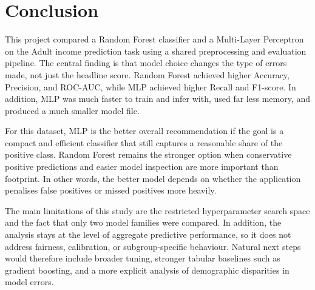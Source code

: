 \section{Conclusion}

This project compared a Random Forest classifier and a Multi-Layer Perceptron on the Adult income prediction task using a shared preprocessing and evaluation pipeline. The central finding is that model choice changes the type of errors made, not just the headline score. Random Forest achieved higher Accuracy, Precision, and ROC-AUC, while MLP achieved higher Recall and F1-score. In addition, MLP was much faster to train and infer with, used far less memory, and produced a much smaller model file.

For this dataset, MLP is the better overall recommendation if the goal is a compact and efficient classifier that still captures a reasonable share of the positive class. Random Forest remains the stronger option when conservative positive predictions and easier model inspection are more important than footprint. In other words, the better model depends on whether the application penalises false positives or missed positives more heavily.

The main limitations of this study are the restricted hyperparameter search space and the fact that only two model families were compared. In addition, the analysis stays at the level of aggregate predictive performance, so it does not address fairness, calibration, or subgroup-specific behaviour. Natural next steps would therefore include broader tuning, stronger tabular baselines such as gradient boosting, and a more explicit analysis of demographic disparities in model errors.
